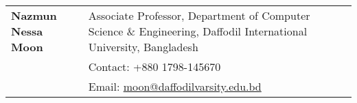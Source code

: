 \documentclass[a4paper,11pt]{article}
\begin{document}
\begin{tabularx}{\linewidth}{@{}l X@{}}
        \textbf{Nazmun Nessa Moon}      & Associate Professor, Department of Computer Science \& Engineering, \newline Daffodil International University, Bangladesh \\
        & Contact: +880 1798-145670                                                                                                  \\
        & Email: \href{mailto:moon@daffodilvarsity.edu.bd}{moon@daffodilvarsity.edu.bd} \\[3.75pt]
    \end{tabularx}


    \vfill
\end{document}
